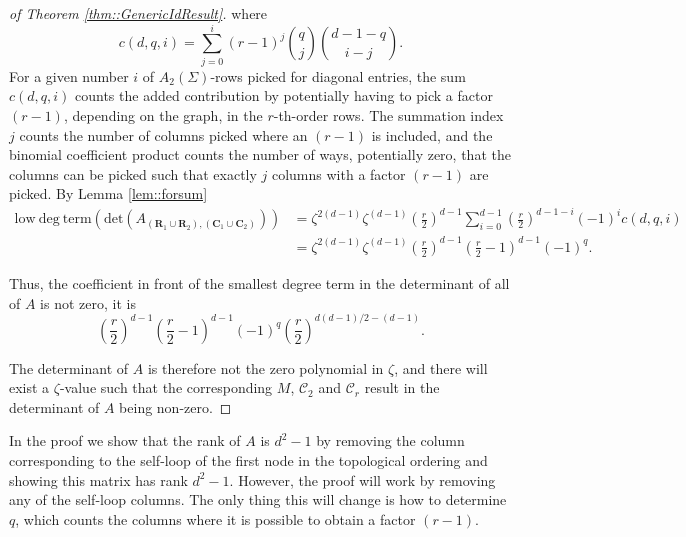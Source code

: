 \documentclass{biometrika}
\begin{document}
\begin{proof}[of Theorem \ref{thm::GenericIdResult}]
where $$c(d,q,i) = \sum_{j = 0}^{i} (r-1)^{j} \binom{q}{j} \binom{d-1-q}{i-j}.$$ For a given number $i$ of $A_2(\Sigma)$-rows picked for diagonal entries, the sum $c(d,q,i)$ counts the added contribution by potentially having to pick a factor $(r-1)$, depending on the graph, in the $r$-th-order rows. The summation index $j$ counts the number of columns picked where an $(r-1)$ is included, and 
the binomial coefficient product counts the number of ways, potentially zero, that the columns can be picked such that exactly $j$ columns with a factor $(r-1)$ are picked. 
By Lemma \ref{lem::forsum}
\begin{align*}
    \mathrm{low\ deg\ term}( \mathrm{det}(A_{(\mathbf{R}_1 \cup \mathbf{R}_2), (\mathbf{C}_1 \cup \mathbf{C}_2)})) &= \zeta^{2(d-1)} \zeta^{(d-1)} \left(\frac{r}{2} \right)^{d-1}   \sum_{i = 0}^{d-1} \left(\frac{r}{2} \right)^{d-1-i} (-1)^{i} c(d,q,i) \\ 
    &=  \zeta^{2(d-1)} \zeta^{(d-1)} \left(\frac{r}{2} \right)^{d-1} \left(\frac{r}{2} -1 \right)^{d-1} (-1)^{q}. 
\end{align*}

Thus, the coefficient in front of the smallest degree term in the determinant of all of $A$ is not zero, it is 
$$\left(\frac{r}{2} \right)^{d-1} \left(\frac{r}{2} -1 \right)^{d-1} (-1)^{q} \left( \frac{r}{2} \right)^{d(d-1)/2 -(d-1)}.$$ 

The determinant of $A$ is therefore not the zero polynomial in $\zeta$, and there will exist a $\zeta$-value such that the corresponding $M$, $\mathcal{C}_2$ and $\mathcal{C}_r$ result in the determinant of $A$ being non-zero.
\end{proof}


\begin{remark}   
In the proof we show that the rank of $A$ is $d^2-1$ by removing the column corresponding to the self-loop of the first node in the topological ordering and showing this matrix has rank $d^2-1$. However, the proof will work by removing any of the self-loop columns. The only thing this will change is how to determine $q$, which counts the columns where it is possible to obtain a factor $(r-1)$. 
\end{remark}
\end{document}
